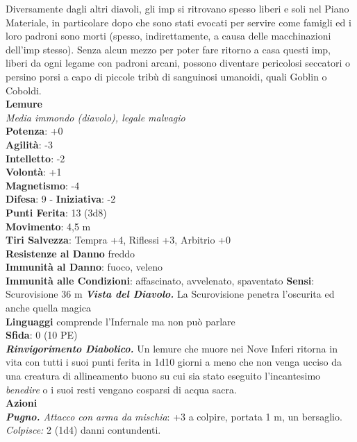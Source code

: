 \begin{multicols}{2}
Diversamente dagli altri diavoli, gli imp si ritrovano spesso liberi e soli nel Piano Materiale, in particolare dopo che sono stati evocati per servire come famigli ed i loro padroni sono morti (spesso, indirettamente, a causa delle macchinazioni dell’imp stesso). Senza alcun mezzo per poter fare ritorno a casa questi imp, liberi da ogni legame con padroni arcani, possono diventare pericolosi seccatori o persino porsi a capo di piccole tribù di sanguinosi umanoidi, quali Goblin o Coboldi.\\


\medskip\textbf{Lemure}\\
\emph{Media immondo (diavolo), legale malvagio}\\
\textbf{Potenza}: +0\\
\textbf{Agilità}: -3\\
\textbf{Intelletto}: -2\\
\textbf{Volontà}: +1\\
\textbf{Magnetismo}: -4\\
\textbf{Difesa}: 9 - \textbf{Iniziativa}: -2\\
\textbf{Punti Ferita}: 13 (3d8)\\
\textbf{Movimento}: 4,5 m\\
\textbf{Tiri Salvezza}: Tempra +4, Riflessi +3, Arbitrio +0\\
\textbf{Resistenze al Danno} freddo\\
\textbf{Immunità al Danno}: fuoco, veleno\\
\textbf{Immunità alle Condizioni}: affascinato, avvelenato, spaventato
\textbf{Sensi}: Scurovisione 36 m
\emph{\textbf{Vista del Diavolo.}} La Scurovisione penetra l'oscurita ed anche quella magica\\
\textbf{Linguaggi} comprende l'Infernale ma non può parlare\\
\textbf{Sfida}: 0 (10 PE)\smallskip\\
\emph{\textbf{Rinvigorimento Diabolico.}} Un lemure che muore nei Nove Inferi ritorna in vita con tutti i suoi punti ferita in 1d10 giorni a meno che non venga ucciso da una creatura di allineamento buono su cui sia stato eseguito l'incantesimo \emph{benedire} o i suoi resti vengano cosparsi di acqua sacra.\\
\smallskip\textbf{Azioni} \\
\emph{\textbf{Pugno.} Attacco con arma da mischia}: +3 a colpire, portata 1 m, un bersaglio.\\
\emph{Colpisce:} 2 (1d4) danni contundenti.\\

\end{multicols}

